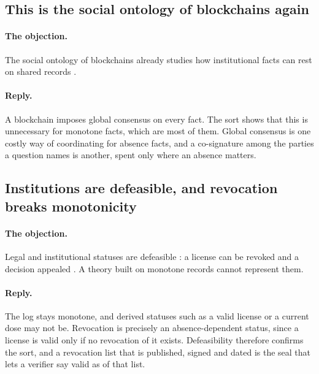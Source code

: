 \subsection{This is the social ontology of blockchains again}\label{sec:obj-blockchain}

\paragraph{The objection.} The social ontology of blockchains already studies how institutional facts
can rest on shared records \citep{reijers2018,davidson2018,suzuki2026}.

\paragraph{Reply.} A blockchain imposes global consensus on every fact. The sort shows that this is
unnecessary for monotone facts, which are most of them. Global consensus is one costly way of
coordinating for absence facts, and a co-signature among the parties a question names is another,
spent only where an absence matters.

\subsection{Institutions are defeasible, and revocation breaks monotonicity}\label{sec:obj-defeasible}

\paragraph{The objection.} Legal and institutional statuses are defeasible \citep{hart1949}: a
license can be revoked and a decision appealed \citep{prakken2004}. A theory built on monotone records
cannot represent them.

\paragraph{Reply.} The log stays monotone, and derived statuses such as a valid license or a current
dose may not be. Revocation is precisely an absence-dependent status, since a license is valid only
if no revocation of it exists. Defeasibility therefore confirms the sort, and a revocation list that
is published, signed and dated is the seal that lets a verifier say valid as of that list.
